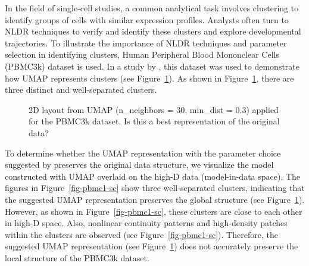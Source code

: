 \documentclass[
  12pt]{article}
\begin{document}
In the field of single-cell studies, a common analytical task involves
clustering to identify groups of cells with similar expression profiles.
Analysts often turn to NLDR techniques to verify and identify these
clusters and explore developmental trajectories. To illustrate the
importance of NLDR techniques and parameter selection in identifying
clusters, Human Peripheral Blood Mononclear Cells (PBMC3k) dataset
\citep{chen2023} is used. In a study by \citet{chen2023}, this dataset
was used to demonstrate how UMAP represents clusters (see
Figure~\ref{fig-umapauthor}). As shown in Figure~\ref{fig-umapauthor},
there are three distinct and well-separated clusters.

\begin{figure}[H]


\caption{\label{fig-umapauthor}2D layout from UMAP (n\_neighbors = 30,
min\_dist = 0.3) applied for the PBMC3k dataset. Is this a best
representation of the original data?}

\end{figure}%

To determine whether the UMAP representation with the parameter choice
suggested by \citet{chen2023} preserves the original data structure, we
visualize the model constructed with UMAP overlaid on the high-D data
(model-in-data space). The figures in Figure~\ref{fig-pbmc1-sc} show
three well-separated clusters, indicating that the suggested UMAP
representation preserves the global structure (see
Figure~\ref{fig-umapauthor}). However, as shown in
Figure~\ref{fig-pbmc1-sc}, these clusters are close to each other in
high-D space. Also, nonlinear continuity patterns and high-density
patches within the clusters are observed (see
Figure~\ref{fig-pbmc1-sc}). Therefore, the suggested UMAP representation
(see Figure~\ref{fig-umapauthor}) does not accurately preserve the local
structure of the PBMC3k dataset.
\end{document}
